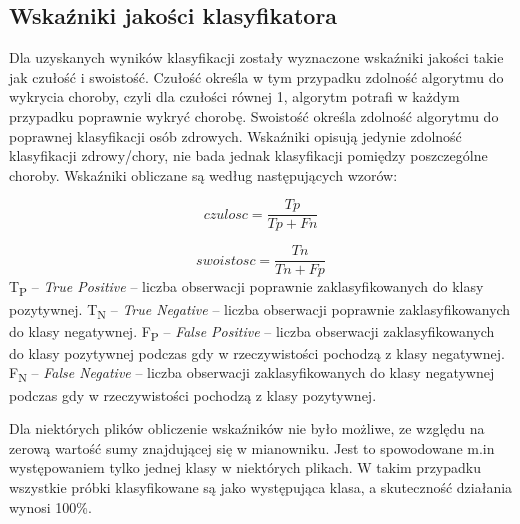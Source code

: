 \subsection{Wskaźniki jakości klasyfikatora}

Dla uzyskanych wyników klasyfikacji zostały wyznaczone wskaźniki jakości takie jak czułość i swoistość. Czułość określa w tym przypadku zdolność algorytmu do wykrycia choroby, czyli dla czułości równej 1, algorytm potrafi w każdym przypadku poprawnie wykryć chorobę. Swoistość określa zdolność algorytmu do poprawnej klasyfikacji osób zdrowych. Wskaźniki opisują jedynie zdolność klasyfikacji zdrowy/chory, nie bada jednak klasyfikacji pomiędzy poszczególne choroby. 
\newline
Wskaźniki obliczane są według następujących wzorów:

\begin{equation}
czulosc = \frac{Tp}{Tp+Fn}
\end{equation}

\begin{equation}
swoistosc = \frac{Tn}{Tn+Fp}
\end{equation}
\newline
T\textsubscript{P} – \textit{True Positive} – liczba obserwacji poprawnie zaklasyfikowanych do klasy pozytywnej.
\newline
T\textsubscript{N} – \textit{True Negative} – liczba obserwacji poprawnie zaklasyfikowanych do klasy negatywnej.
\newline
F\textsubscript{P} – \textit{False Positive} – liczba obserwacji zaklasyfikowanych do klasy pozytywnej podczas gdy w rzeczywistości pochodzą z klasy negatywnej.
\newline
F\textsubscript{N} – \textit{False Negative} – liczba obserwacji zaklasyfikowanych do klasy negatywnej podczas gdy w rzeczywistości pochodzą z klasy pozytywnej.


Dla niektórych plików obliczenie wskaźników nie było możliwe, ze względu na zerową wartość sumy znajdującej się w mianowniku. Jest to spowodowane m.in występowaniem tylko jednej klasy w niektórych plikach. W takim przypadku wszystkie próbki klasyfikowane są jako występująca klasa, a skuteczność działania wynosi 100\%.

